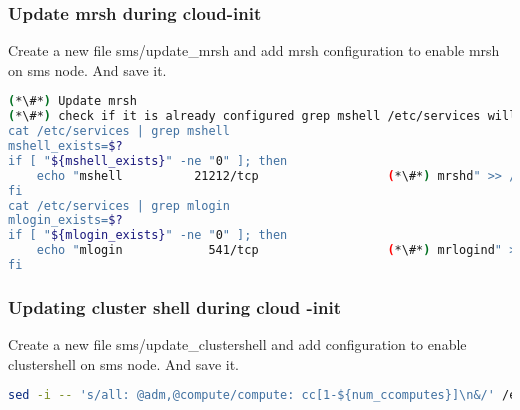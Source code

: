 \subsubsection{Update mrsh during cloud-init}
 
Create a new file sms/update\_mrsh and add mrsh configuration to enable mrsh on sms node. And save it. 

\begin{lstlisting}[language=bash,keywords={}]
(*\#*) Update mrsh
(*\#*) check if it is already configured grep mshell /etc/services will return non-zero, else configure"
cat /etc/services | grep mshell
mshell_exists=$?
if [ "${mshell_exists}" -ne "0" ]; then
    echo "mshell          21212/tcp                  (*\#*) mrshd" >> /etc/services
fi
cat /etc/services | grep mlogin
mlogin_exists=$?
if [ "${mlogin_exists}" -ne "0" ]; then
    echo "mlogin            541/tcp                  (*\#*) mrlogind" >> /etc/services
fi
\end{lstlisting}


\subsubsection{Updating cluster shell during cloud -init}
Create a new file sms/update\_clustershell and add configuration to enable clustershell on sms node. And save it. 

\begin{lstlisting}[language=bash,keywords={}]
sed -i -- 's/all: @adm,@compute/compute: cc[1-${num_ccomputes}]\n&/' /etc/clustershell/groups.d/local.cfg
\end{lstlisting}